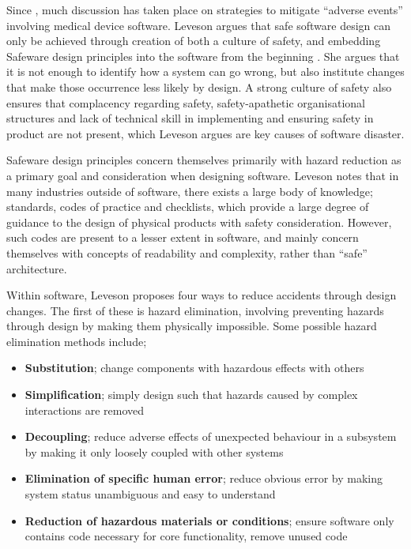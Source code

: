 \documentclass{cshonours}
\begin{document}
Since \ther, much discussion has taken place on strategies to mitigate ``adverse events'' involving medical device software. Leveson argues that safe software design can only be achieved through creation of both a culture of safety, \cite[ch.~4]{safeware} and embedding Safeware design principles into the software from the beginning \cite[ch.~16]{safeware}. She argues that it is not enough to identify how a system can go wrong, but also institute changes that make those occurrence less likely by design. A strong culture of safety also ensures that complacency regarding safety, safety-apathetic organisational structures and lack of technical skill in implementing and ensuring safety in product are not present, which Leveson argues are key causes of software disaster.

Safeware design principles concern themselves primarily with hazard reduction as a primary goal and consideration when designing software. Leveson notes that in many industries outside of software, there exists a large body of knowledge; standards, codes of practice and checklists, which provide a large degree of guidance to the design of physical products with safety consideration. However, such codes are present to a lesser extent in software, and mainly concern themselves with concepts of readability and complexity, rather than ``safe'' architecture.

Within software, Leveson proposes four ways to reduce accidents through design changes. The first of these is hazard elimination, involving preventing hazards through design by making them physically impossible. Some possible hazard elimination methods include;
 \begin{itemize}
  \item \textbf{Substitution}; change components with hazardous effects with others
  \item \textbf{Simplification}; simply design such that hazards caused by complex interactions are removed
  \item \textbf{Decoupling}; reduce adverse effects of unexpected behaviour in a subsystem by making it only loosely coupled with other systems
  \item \textbf{Elimination of specific human error}; reduce obvious error by making system status unambiguous and easy to understand
  \item \textbf{Reduction of hazardous materials or conditions}; ensure software only contains code necessary for core functionality, remove unused code
 \end{itemize}
 
\end{document}
